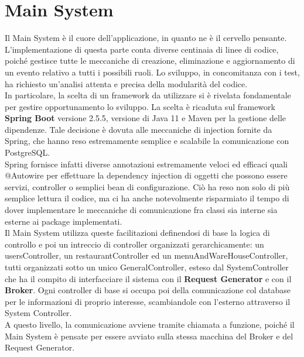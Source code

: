 \section{Main System}
Il Main System è il cuore dell'applicazione, in quanto ne è il cervello pensante. L'implementazione di questa parte conta diverse centinaia di linee di codice, poiché gestisce tutte le meccaniche di creazione, eliminazione e aggiornamento di un evento relativo a tutti i possibili ruoli. Lo sviluppo, in concomitanza con i test, ha richiesto un'analisi attenta e precisa della modularità del codice. 
\\In particolare, la scelta di un framework da utilizzare si è rivelata fondamentale per gestire opportunamento lo sviluppo. La scelta è ricaduta sul framework \textbf{Spring Boot} versione 2.5.5, versione di Java 11 e Maven per la gestione delle dipendenze. Tale decisione è dovuta alle meccaniche di injection fornite da Spring, che hanno reso estremamente semplice e scalabile la comunicazione con PostgreSQL. 
\\Spring fornisce infatti diverse annotazioni estremamente veloci ed efficaci quali @Autowire per effettuare la dependency injection di oggetti che possono essere servizi, controller o semplici bean di configurazione. Ciò ha reso non solo di più semplice lettura il codice, ma ci ha anche notevolmente risparmiato il tempo di dover implementare le meccaniche di comunicazione fra classi sia interne sia esterne ai package implementati. \vspace{0.5cm}
\\Il Main System utilizza queste facilitazioni definendosi di base la logica di controllo e poi un intreccio di controller organizzati gerarchicamente: un usersController, un restaurantController ed un menuAndWareHouseController, tutti organizzati sotto un unico GeneralController, esteso dal SystemController che ha il compito di interfacciare il sistema con il \textbf{Request Generator} e con il \textbf{Broker}. Ogni controller di base si occupa poi della comunicazione col database per le informazioni di proprio interesse, scambiandole con l'esterno attraverso il System Controller. 
\\A questo livello, la comunicazione avviene tramite chiamata a funzione, poiché il Main System è pensate per essere avviato sulla stessa macchina del Broker e del Request Generator. 

